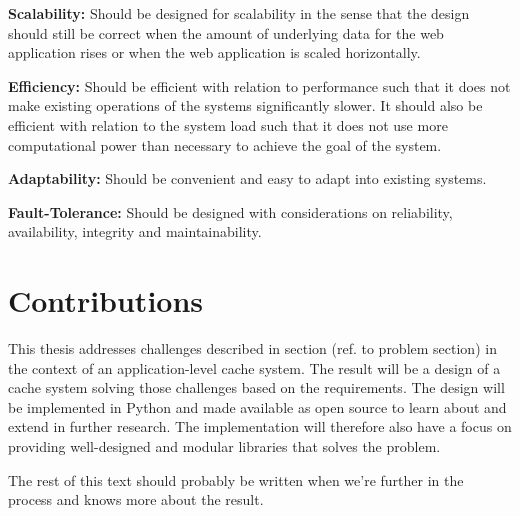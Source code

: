 \textbf{Scalability:} Should be designed for scalability in the sense that the design should still be correct when the amount of underlying data for the web application rises or when the web application is scaled horizontally.

\textbf{Efficiency:} Should be efficient with relation to performance such that it does not make existing operations of the systems significantly slower. It should also be efficient with relation to the system load such that it does not use more computational power than necessary to achieve the goal of the system.

\textbf{Adaptability:} Should be convenient and easy to adapt into existing systems.

\textbf{Fault-Tolerance:} Should be designed with considerations on reliability, availability, integrity and maintainability.

\section{Contributions}
This thesis addresses challenges described in section (ref. to problem section) in the context of an application-level cache system. The result will be a design of a cache system solving those challenges based on the requirements. The design will be implemented in Python and made available as open source to learn about and extend in further research. The implementation will therefore also have a focus on providing well-designed and modular libraries that solves the problem.

The rest of this text should probably be written when we’re further in the process and knows more about the result.


